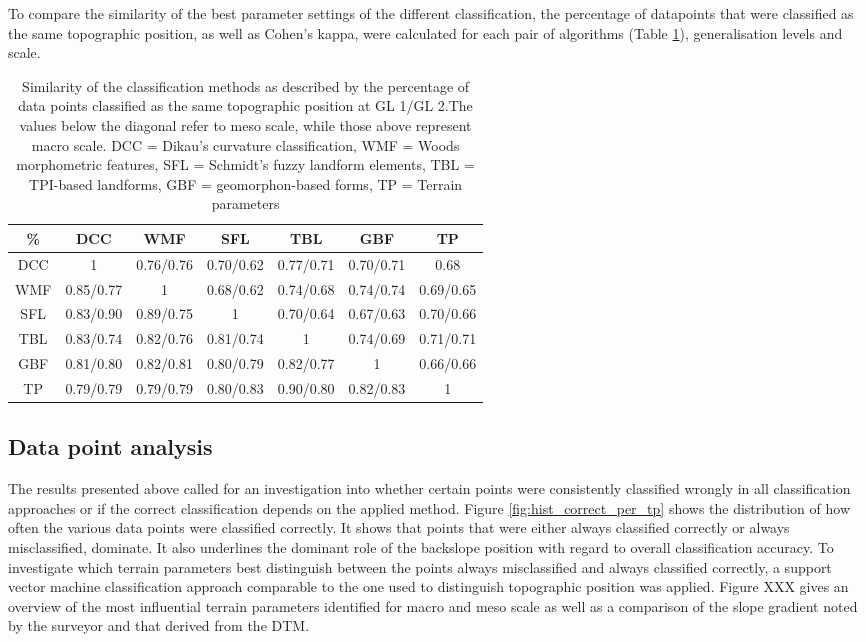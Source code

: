 \documentclass[final,1p,times,twocolumn,authoryear]{elsarticle}
\begin{document}
To compare the similarity of the best parameter settings of the different classification, the percentage of datapoints that were classified as the same topographic position, as well as Cohen's kappa, were calculated for each pair of algorithms (Table \ref{table:similarity_matrix}), generalisation levels and scale. 
\begin{table}[ht]
\caption{Similarity of the classification methods as described by the percentage of data points classified as the same topographic position at GL 1/GL 2.The values below the diagonal refer to meso scale, while those above represent macro scale. DCC = Dikau's curvature classification, WMF = Woods morphometric features, SFL = Schmidt's fuzzy landform elements, TBL = TPI-based landforms, GBF = geomorphon-based forms, TP = Terrain parameters}
\centering
\begin{tabular}{ccccccc}
  \hline
\%  & DCC & WMF &SFL &TBL & GBF & TP \\ 
  \hline
DCC &1 & 0.76/0.76 & 0.70/0.62 & 0.77/0.71 & 0.70/0.71 & 0.68 \\ 
WMF &0.85/0.77  & 1 & 0.68/0.62 & 0.74/0.68 & 0.74/0.74 & 0.69/0.65 \\ 
SFL & 0.83/0.90 & 0.89/0.75 & 1 & 0.70/0.64 & 0.67/0.63 & 0.70/0.66 \\ 
TBL & 0.83/0.74 &0.82/0.76  &0.81/0.74  & 1 & 0.74/0.69 & 0.71/0.71 \\ 
GBF &0.81/0.80  &0.82/0.81  & 0.80/0.79  & 0.82/0.77 & 1 & 0.66/0.66 \\ 
TP &0.79/0.79  &0.79/0.79  &0.80/0.83  &0.90/0.80  &0.82/0.83  & 1 \\ 
   \hline
\end{tabular}
\label{table:similarity_matrix}
\end{table}



\subsection{Data point analysis} 
The results presented above called for an investigation into whether certain points were consistently classified wrongly in all classification approaches or if the correct classification depends on the applied method. Figure \ref{fig:hist_correct_per_tp} shows the distribution of how often the various data points were classified correctly. It shows that points that were either always classified correctly or always misclassified, dominate. It also underlines the dominant role of the backslope position with regard to overall classification accuracy. To investigate which terrain parameters best distinguish between the points always misclassified and always classified correctly, a support vector machine classification approach comparable to the one used to distinguish topographic position was applied. Figure XXX gives an overview of the most influential terrain parameters identified for macro and meso scale as well as a comparison of the slope gradient noted by the surveyor and that derived from the DTM. 
\end{document}
